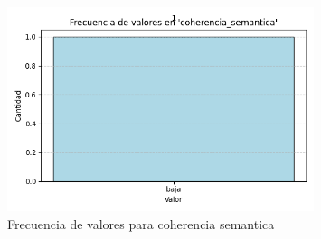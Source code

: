\documentclass{article}
\begin{document}
\begin{figure}[H]
\centering
\includegraphics[width=0.8\textwidth]{../graficos/coherencia_semantica_frecuencias.png}
\caption{Frecuencia de valores para coherencia semantica}
\end{figure}
\end{document}
